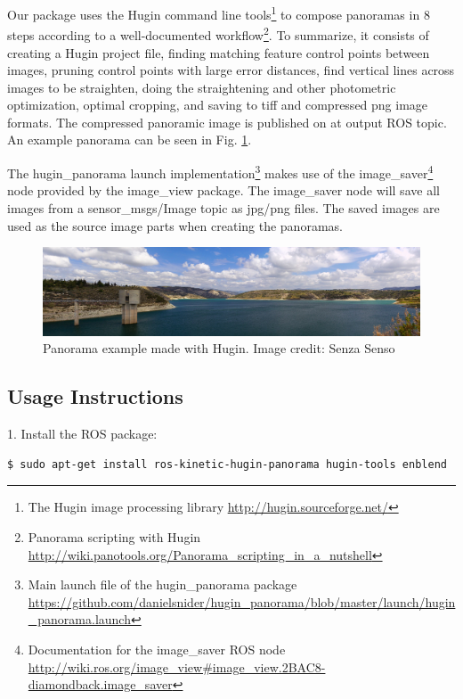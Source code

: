 \documentclass[runningheads,a4paper]{llncs}
\begin{document}
Our package uses the Hugin command line tools\footnote{The Hugin image processing library \url{http://hugin.sourceforge.net/}} to compose panoramas in 8 steps according to a well-documented workflow\footnote{Panorama scripting with Hugin \url{http://wiki.panotools.org/Panorama_scripting_in_a_nutshell}}. To summarize, it consists of creating a Hugin project file, finding matching feature control points between images, pruning control points with large error distances, find vertical lines across images to be straighten, doing the straightening and other photometric optimization, optimal cropping, and saving to tiff and compressed png image formats. The compressed panoramic image is published on at output ROS topic. An example panorama can be seen in Fig. \ref{fig:pano}.

The hugin\_panorama launch implementation\footnote{Main launch file of the hugin\_panorama package \url{https://github.com/danielsnider/hugin_panorama/blob/master/launch/hugin_panorama.launch}} makes use of the image\_saver\footnote{Documentation for the image\_saver ROS node \url{http://wiki.ros.org/image_view#image_view.2BAC8-diamondback.image_saver}} node provided by the image\_view package. The image\_saver node will save all images from a sensor\_msgs/Image topic as jpg/png files. The saved images are used as the source image parts when creating the panoramas.
 
\begin{figure}
\centering
\includegraphics[width=\textwidth]{pano}
\caption{Panorama example made with Hugin. Image credit: Senza Senso}
\label{fig:pano}
\end{figure}  

\subsection{Usage Instructions}

1. Install the ROS package:

\begin{lstlisting}[frame=single,basicstyle=\ttfamily\footnotesize,breaklines=true]
$ sudo apt-get install ros-kinetic-hugin-panorama hugin-tools enblend
\end{lstlisting}
\end{document}
